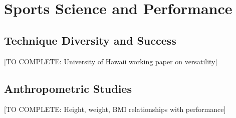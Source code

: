 \section{Sports Science and Performance}

\subsection{Technique Diversity and Success}

[TO COMPLETE: University of Hawaii working paper on versatility]

\subsection{Anthropometric Studies}

[TO COMPLETE: Height, weight, BMI relationships with performance]